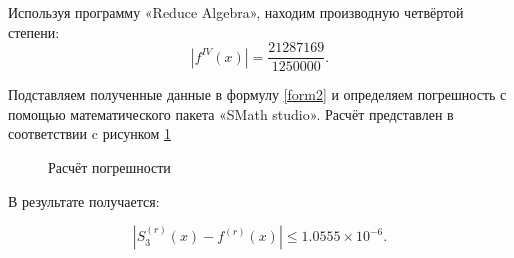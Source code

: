 \documentclass[russian,utf8,nocolumnxxxi,nocolumnxxxii]{eskdtext}
\begin{document}
Используя программу «Reduce Algebra», находим производную четвёртой степени:
\begin{equation}
\left | f^{IV}(x) \right |=\frac{21287169}{1250000}.
\end{equation}

Подставляем полученные данные в формулу \ref{form2} и определяем погрешность с помощью математического  пакета  «SMath studio». Расчёт представлен в соответствии c рисунком \ref{kof3}

\begin{figure}[h!]
\begin{center}
\begin{minipage}[h]{0.3\linewidth}
\end{minipage}
\caption{Расчёт погрешности } \label{kof3}
\end{center}
\end{figure}

В результате получается:

\begin{equation}
\left | S_3^{(r)}(x) - f^{(r)}(x) \right | \leqslant 1.0555 \times 10^{-6}.
\end{equation}
\end{document}

